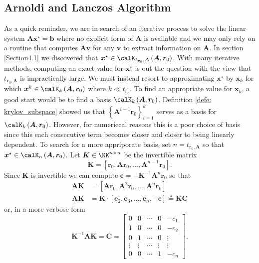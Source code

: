 \subsection{Arnoldi and Lanczos Algorithm}\label{Section4.3}

As a quick reminder, we are in search of an iterative process to solve the linear system $\bm{A} \bm{x}^{\star} = \bm{b}$ where no explicit form of $\bm{A}$ is available and we may only rely on a routine that computes $\bm{A} \bm{v}$ for any $\bm{v}$ to extract information on $\bm{A}$. In section \ref{Section4.1} we discovered that $\bm{x}^{\star} \in \calK_{t_{\bm{r}_0}, \bm{A}} \left( \bm{A}, \bm{r}_0 \right)$. With many iterative methods, computing an exact value for $\bm{x}^{\star}$ is out the question with the view that $t_{\bm{r}_0, \bm{A}}$ is impractically large. We must instead resort to approximating $\bm{x}^{\star}$ by $\bm{x}_k$ for which $\bm{x}^{k} \in \calK_{k} \left( \bm{A}, \bm{r}_0 \right)$ where $k \ll t_{\bm{r}_0}$. To find an appropriate value for $\bm{x}_k$, a good start would be to find a basis $\calK_{k} \left( \bm{A}, \bm{r}_0 \right)$. Definition \ref{defe: krylov_subspace} showed us that $\left\{ \bm{A}^{i-1} \bm{r}_0 \right\}_{i=1}^{k}$ serves as a basis for $\calK_{k} \left( \bm{A}, \bm{r}_0 \right)$. However, for numericcal reasons this is a poor choice of basis since this each consecutive term becomes closer and closer to being linearly dependent. To search for a more appriporate basis, set $n = t_{\bm{r}_0, \bm{A}}$ so that $\bm{x}^{\star} \in \calK_{n} \left( \bm{A}, \bm{r}_0 \right)$. Let $\bm{K} \in \KK^{n \times n}$ be the invertible matrix
\[
    \bm{K} = \left[ \bm{r}_0 , \bm{A} \bm{r}_0, \ldots , \bm{A}^{n-1} \bm{r}_0 \right].
\]
Since $\bm{K}$ is invertible we can compute $\bm{c} = - \bm{K}^{-1} \bm{A}^{n} \bm{r}_0$ so that
\begin{align*}
    \bm{A} \bm{K} & = \left[ \bm{A} \bm{r}_0, \bm{A}^{2} \bm{r}_0, \ldots , \bm{A}^{n} \bm{r}_0 \right]                     \\
    \bm{A} \bm{K} & = \bm{K} \cdot \left[ \bm{e}_2, \bm{e}_3, \ldots , \bm{e}_n, - \bm{c}  \right] \triangleq \bm{K} \bm{C}
\end{align*}
or, in a more verbose form
\[
    \bm{K}^{-1} \bm{A} \bm{K} = \bm{C} =
    \begin{bmatrix}
        0      & 0      & \cdots & 0      & -c_1   \\
        1      & 0      & \cdots & 0      & -c_2   \\
        0      & 1      & \cdots & 0      & \vdots \\
        \vdots & \vdots & \cdots & \vdots & \vdots \\
        0      & 0      & \cdots & 1      & -c_n
    \end{bmatrix}.
\]
